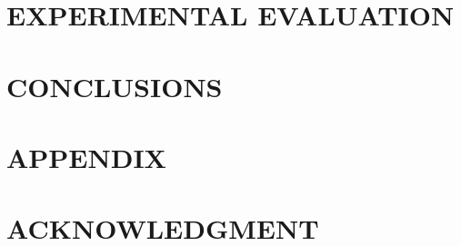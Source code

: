 \documentclass[letterpaper, 10 pt, conference]{ieeeconf}  %
\begin{document}
\section{EXPERIMENTAL EVALUATION}



\section{CONCLUSIONS}



\section*{APPENDIX}


\section*{ACKNOWLEDGMENT}




\end{document}
